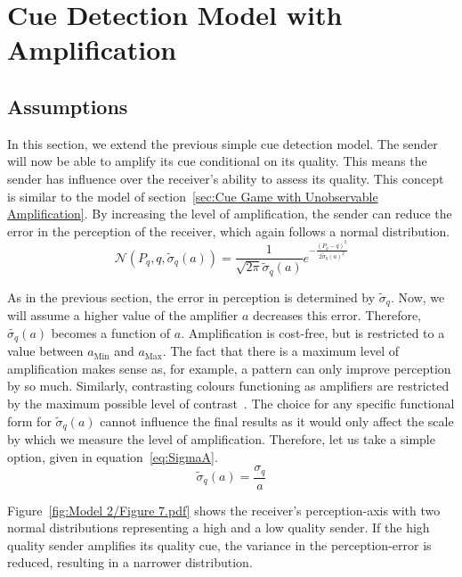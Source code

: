 \documentclass[a4paper,12pt]{article}
\numberwithin{equation}{section}
\begin{document}
\newpage\clearpage


\section{Cue Detection Model with Amplification}
\label{sec:Cue Detection Model with Amplification}
\subsection{Assumptions}
\label{sec:CueDetectionModelwithAmplification/Assumptions}

In this section, we extend the previous simple cue detection model. The sender will now be able to amplify its cue conditional on its quality. This means the sender has influence over the receiver's ability to assess its quality. This concept is similar to the model of section~\ref{sec:Cue Game with Unobservable Amplification}. By increasing the level of amplification, the sender can reduce the error in the perception of the receiver, which again follows a normal distribution.
\begin{equation}
\label{eq:CueDetectionModelwithAmplification/Normal}
\mathcal{N}(P_{q}, q, \tilde{\sigma}_{q}(a)) = \frac{1}{\sqrt{2 \pi} \tilde{\sigma}_{q}(a)} e^{-\frac{(P_{q}-q)^2}{2 \tilde{\sigma}_{q}(a)^2}}
\end{equation}

As in the previous section, the error in perception is determined by $\tilde{\sigma}_{q}$. Now, we will assume a higher value of the amplifier $a$ decreases this error. Therefore, $\tilde{\sigma_{q}}(a)$ becomes a function of $a$. Amplification is cost-free, but is restricted to a value between $a_{\text{Min}}$ and $a_{\text{Max}}$. The fact that there is a maximum level of amplification makes sense as, for example, a pattern can only improve perception by so much. Similarly, contrasting colours functioning as amplifiers are restricted by the maximum possible level of contrast~\cite{Hasson1991}. The choice for any specific functional form for $\tilde{\sigma}_{q}(a)$ cannot influence the final results as it would only affect the scale by which we measure the level of amplification. Therefore, let us take a simple option, given in equation~\ref{eq:SigmaA}.
\begin{equation}
\label{eq:SigmaA}
\tilde{\sigma}_{q}(a)=\frac{\sigma_{q}}{a}
\end{equation}

Figure~\ref{fig:Model 2/Figure 7.pdf} shows the receiver's perception-axis with two normal distributions representing a high and a low quality sender. If the high quality sender amplifies its quality cue, the variance in the perception-error is reduced, resulting in a narrower distribution.
\end{document}
